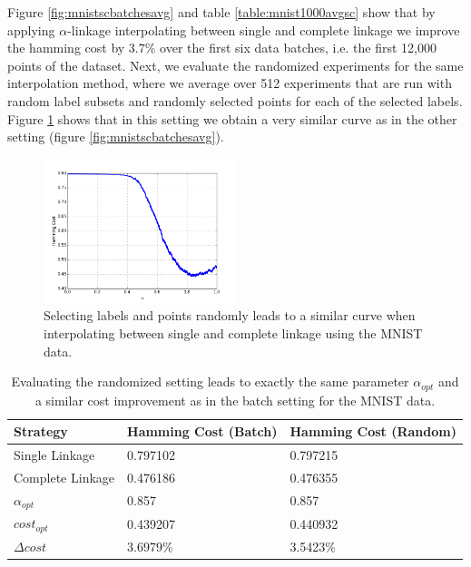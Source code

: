 Figure \ref{fig:mnistscbatchesavg} and table \ref{table:mnist1000avgsc} show that by applying $\alpha$-linkage interpolating between single and complete linkage we improve the hamming cost by $3.7\%$ over the first six data batches, i.e. the first 12,000 points of the dataset. Next, we evaluate the randomized experiments for the same interpolation method, where we average over 512 experiments that are run with random label subsets and randomly selected points for each of the selected labels. Figure \ref{fig:mnistscrandom} shows that in this setting we obtain a very similar curve as in the other setting (figure \ref{fig:mnistscbatchesavg}).

\begin{figure}[h]
    \centering
    \includegraphics[width=0.5\textwidth]{plots/mnist-sc-random.png}
    \caption{Selecting labels and points randomly leads to a similar curve when interpolating between single and complete linkage using the MNIST data.}
    \label{fig:mnistscrandom}
\end{figure}

\begin{table}[H]
    \centering
    \begin{tabular}{|l | l | l |}
    \hline
    Strategy & Hamming Cost (Batch) & Hamming Cost (Random)\\ \hline
    Single Linkage & 0.797102 & 0.797215\\
    Complete Linkage & 0.476186 & 0.476355\\
    $\alpha_{opt}$ & 0.857 & 0.857\\
    $cost_{opt}$ & 0.439207 & 0.440932\\
    $\Delta cost$ & 3.6979\% & 3.5423\%\\\hline
    \end{tabular}
    \caption{Evaluating the randomized setting leads to exactly the same parameter $\alpha_{opt}$ and a similar cost improvement as in the batch setting for the MNIST data.}
    \label{table:mnist1000randomsc}
\end{table}

